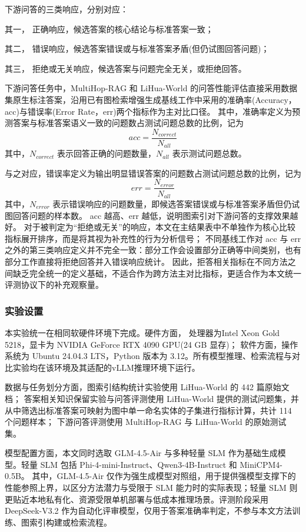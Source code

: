 \documentclass[promaster, vlined]{DissertUESTC}
\begin{document}
下游问答的三类响应，分别对应：

其一， 正确响应，候选答案的核心结论与标准答案一致；

其二， 错误响应，候选答案错误或与标准答案矛盾(但仍试图回答问题)；

其三， 拒绝或无关响应，候选答案与问题完全无关，或拒绝回答。

下游问答任务中，MultiHop-RAG 和 LiHua-World 的问答性能评估直接采用数据集原生标注答案，沿用已有图检索增强生成基线工作中采用的准确率(Accuracy，acc)与错误率(Error Rate，err)两个指标作为主对比口径。
其中，准确率定义为预测答案与标准答案语义一致的问题数占测试问题总数的比例，记为
\begin{equation}
acc = \frac{N_{correct}}{N_{all}}
\end{equation}
其中，$N_{correct}$ 表示回答正确的问题数量，$N_{all}$ 表示测试问题总数。

与之对应，错误率定义为输出明显错误答案的问题数占测试问题总数的比例，记为
\begin{equation}
err = \frac{N_{error}}{N_{all}}
\end{equation}
其中，$N_{error}$ 表示错误响应的问题数量，即候选答案错误或与标准答案矛盾但仍试图回答问题的样本数。
acc 越高、err 越低，说明图索引对下游问答的支撑效果越好。
对于被判定为“拒绝或无关”的响应，本文在主结果表中不单独作为核心比较指标展开排序，而是将其视为补充性的行为分析信号；
不同基线工作对 acc 与 err 之外的第三类响应定义并不完全一致：部分工作会设置部分正确等中间类别，也有部分工作直接将拒绝回答并入错误响应统计。
因此，拒答相关指标在不同方法之间缺乏完全统一的定义基础，不适合作为跨方法主对比指标，更适合作为本文统一评测协议下的补充观察量。


\subsubsection{实验设置}
本实验统一在相同软硬件环境下完成。硬件方面， 处理器为Intel Xeon Gold 5218，显卡为 NVIDIA GeForce RTX 4090 GPU(24 GB 显存)；
软件方面，操作系统为 Ubuntu 24.04.3 LTS，Python 版本为 3.12。所有模型推理、检索流程与对比实验均在该环境及其适配的vLLM推理环境下运行。

数据与任务划分方面，图索引结构统计实验使用 LiHua-World 的 442 篇原始文档；
答案相关知识保留实验与问答评测使用 LiHua-World 提供的测试问题集，并从中筛选出标准答案可映射为图中单一命名实体的子集进行指标计算，共计 114 个问题样本；
下游问答评测使用 MultiHop-RAG 与 LiHua-World 的原始测试集。

模型配置方面，本文同时选取 GLM-4.5-Air\cite{5team2025glm45agenticreasoningcoding} 与多种轻量 SLM 作为基础生成模型。轻量 SLM 包括 Phi-4-mini-Instruct\cite{microsoft2025phi4minitechnicalreportcompact}、Qwen3-4B-Instruct\cite{qwen3-4b-instruct-2507} 和 MiniCPM4-0.5B\cite{team2025minicpm4}。
其中，GLM-4.5-Air 仅作为强生成模型对照组，用于提供强模型支撑下的性能参照上界，以区分方法潜力与受限于 SLM 能力时的实际表现；轻量 SLM 则更贴近本地私有化、资源受限单机部署与低成本推理场景。评测阶段采用 DeepSeek-V3.2\cite{liu2025deepseek} 作为自动化评审模型，仅用于答案准确率判定，不参与本文方法训练、图索引构建或检索流程。
\end{document}
